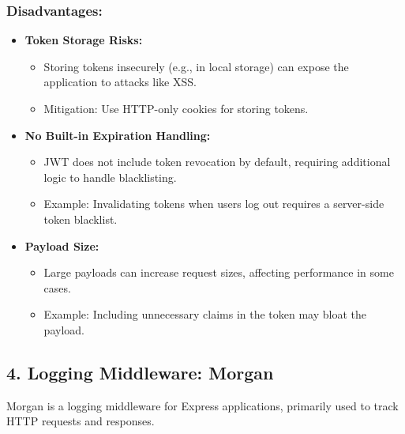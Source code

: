 \subsubsection*{Disadvantages:}
\begin{itemize}
    \item \textbf{Token Storage Risks:}
    \begin{itemize}
        \item Storing tokens insecurely (e.g., in local storage) can expose the application to attacks like XSS.
        \item Mitigation: Use HTTP-only cookies for storing tokens.
    \end{itemize}
    \item \textbf{No Built-in Expiration Handling:}
    \begin{itemize}
        \item JWT does not include token revocation by default, requiring additional logic to handle blacklisting.
        \item Example: Invalidating tokens when users log out requires a server-side token blacklist.
    \end{itemize}
    \item \textbf{Payload Size:}
    \begin{itemize}
        \item Large payloads can increase request sizes, affecting performance in some cases.
        \item Example: Including unnecessary claims in the token may bloat the payload.
    \end{itemize}
\end{itemize}

\subsection*{4. Logging Middleware: Morgan}
Morgan is a logging middleware for Express applications, primarily used to track HTTP requests and responses.

